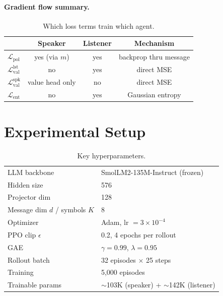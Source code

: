 \documentclass[11pt,a4paper]{article}
\begin{document}
\paragraph{Gradient flow summary.}

\begin{table}[h]
\centering
\caption{Which loss terms train which agent.}
\vspace{0.3em}
\begin{tabular}{@{}lccc@{}}
\toprule
 & \textbf{Speaker} & \textbf{Listener} & \textbf{Mechanism} \\
\midrule
$\mathcal{L}_{\mathrm{pol}}$                    & yes (via $m$)  & yes    & backprop thru message \\
$\mathcal{L}_{\mathrm{val}}^{\mathrm{lst}}$     & no             & yes    & direct MSE \\
$\mathcal{L}_{\mathrm{val}}^{\mathrm{spk}}$     & value head only & no    & direct MSE \\
$\mathcal{L}_{\mathrm{ent}}$                    & no             & yes    & Gaussian entropy \\
\bottomrule
\end{tabular}
\end{table}

\section{Experimental Setup}

\begin{table}[h]
\centering
\caption{Key hyperparameters.}
\vspace{0.3em}
\begin{tabular}{@{}ll@{}}
\toprule
LLM backbone & SmolLM2-135M-Instruct (frozen) \\
Hidden size & 576 \\
Projector dim & 128 \\
Message dim $d$ / symbols $K$ & 8 \\
Optimizer & Adam, lr $= 3{\times}10^{-4}$ \\
PPO clip $\epsilon$ & 0.2, 4 epochs per rollout \\
GAE & $\gamma{=}0.99$, $\lambda{=}0.95$ \\
Rollout batch & 32 episodes $\times$ 25 steps \\
Training & 5{,}000 episodes \\
Trainable params & ${\sim}$103K (speaker) + ${\sim}$142K (listener) \\
\bottomrule
\end{tabular}
\end{table}
\end{document}
